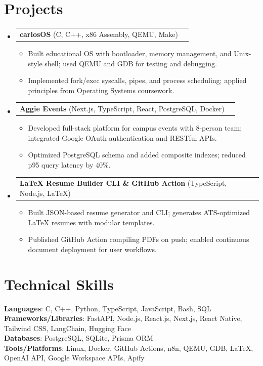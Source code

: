 \documentclass[letterpaper,11pt]{article}
\makeatletter
\newcommand{\resumeItem}[1]{
  \item\small{{#1 \vspace{-2pt}}}
}
\newcommand{\resumeProjectHeading}[2]{
    \item
    \begin{tabular*}{0.97\textwidth}{l@{\extracolsep{\fill}}r}
      \small#1 & #2 \\
    \end{tabular*}\vspace{-7pt}
}
\newcommand{\resumeSubHeadingListStart}{\begin{itemize}[leftmargin=0.15in, label={}]}
\newcommand{\resumeSubHeadingListEnd}{\end{itemize}}
\newcommand{\resumeItemListStart}{\begin{itemize}}
\newcommand{\resumeItemListEnd}{\end{itemize}\vspace{-5pt}}
\makeatother
\begin{document}
\section{Projects}
\resumeSubHeadingListStart
  \resumeProjectHeading
    {\textbf{carlosOS} \textnormal{(C, C++, x86 Assembly, QEMU, Make)}}{}
    \resumeItemListStart
      \resumeItem{Built educational OS with bootloader, memory management, and Unix-style shell; used QEMU and GDB for testing and debugging.}
      \resumeItem{Implemented fork/exec syscalls, pipes, and process scheduling; applied principles from Operating Systems coursework.}
    \resumeItemListEnd

  \resumeProjectHeading
    {\textbf{Aggie Events} \textnormal{(Next.js, TypeScript, React, PostgreSQL, Docker)}}{}
    \resumeItemListStart
      \resumeItem{Developed full-stack platform for campus events with 8-person team; integrated Google OAuth authentication and RESTful APIs.}
      \resumeItem{Optimized PostgreSQL schema and added composite indexes; reduced p95 query latency by 40\%.}
    \resumeItemListEnd

  \resumeProjectHeading
    {\textbf{LaTeX Resume Builder CLI \& GitHub Action} \textnormal{(TypeScript, Node.js, LaTeX)}}{}
    \resumeItemListStart
      \resumeItem{Built JSON-based resume generator and CLI; generates ATS-optimized LaTeX resumes with modular templates.}
      \resumeItem{Published GitHub Action compiling PDFs on push; enabled continuous document deployment for user workflows.}
    \resumeItemListEnd
\resumeSubHeadingListEnd

\section{Technical Skills}
\begin{itemize}[leftmargin=0.15in, label={}]
  \small{\item{
    \textbf{Languages}{: C, C++, Python, TypeScript, JavaScript, Bash, SQL} \\
    \textbf{Frameworks/Libraries}{: FastAPI, Node.js, React.js, Next.js, React Native, Tailwind CSS, LangChain, Hugging Face} \\
    \textbf{Databases}{: PostgreSQL, SQLite, Prisma ORM} \\
    \textbf{Tools/Platforms}{: Linux, Docker, GitHub Actions, n8n, QEMU, GDB, LaTeX, OpenAI API, Google Workspace APIs, Apify}
  }}
\end{itemize}
\end{document}
